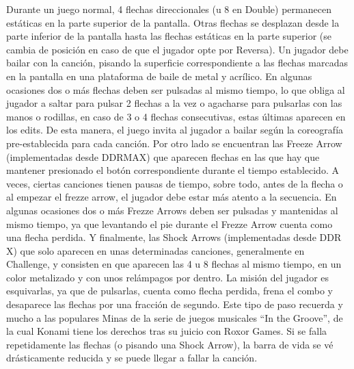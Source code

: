 \documentclass[a4paper,11pt,oneside]{book}
\begin{document}
Durante un juego normal, 4 flechas direccionales (u 8 en Double) permanecen estáticas en la parte superior de la pantalla. Otras flechas se desplazan desde la parte inferior de la pantalla hasta las flechas estáticas en la parte superior (se cambia de posición en caso de que el jugador opte por Reversa). Un jugador debe bailar con la canción, pisando la superficie correspondiente a las flechas marcadas en la pantalla en una plataforma de baile de metal y acrílico. En algunas ocasiones dos o más flechas deben ser pulsadas al mismo tiempo, lo que obliga al jugador a saltar para pulsar 2 flechas a la vez o agacharse para pulsarlas con las manos o rodillas, en caso de 3 o 4 flechas consecutivas, estas últimas aparecen en los edits. De esta manera, el juego invita al jugador a bailar según la coreografía pre-establecida para cada canción. Por otro lado se encuentran las Freeze Arrow (implementadas desde DDRMAX) que aparecen flechas en las que hay que mantener presionado el botón correspondiente durante el tiempo establecido. A veces, ciertas canciones tienen pausas de tiempo, sobre todo, antes de la flecha o al empezar el frezze arrow, el jugador debe estar más atento a la secuencia. En algunas ocasiones dos o más Frezze Arrows deben ser pulsadas y mantenidas al mismo tiempo, ya que levantando el pie durante el Frezze Arrow cuenta como una flecha perdida. Y finalmente, las Shock Arrows (implementadas desde DDR X) que solo aparecen en unas determinadas canciones, generalmente en Challenge, y consisten en que aparecen las 4 u 8 flechas al mismo tiempo, en un color metalizado y con unos relámpagos por dentro. La misión del jugador es esquivarlas, ya que de pulsarlas, cuenta como flecha perdida, frena el combo y desaparece las flechas por una fracción de segundo. Este tipo de paso recuerda y mucho a las populares Minas de la serie de juegos musicales ``In the Groove'', de la cual Konami tiene los derechos tras su juicio con Roxor Games. Si se falla repetidamente las flechas (o pisando una Shock Arrow), la barra de vida se vé drásticamente reducida y se puede llegar a fallar la canción.
\end{document}
